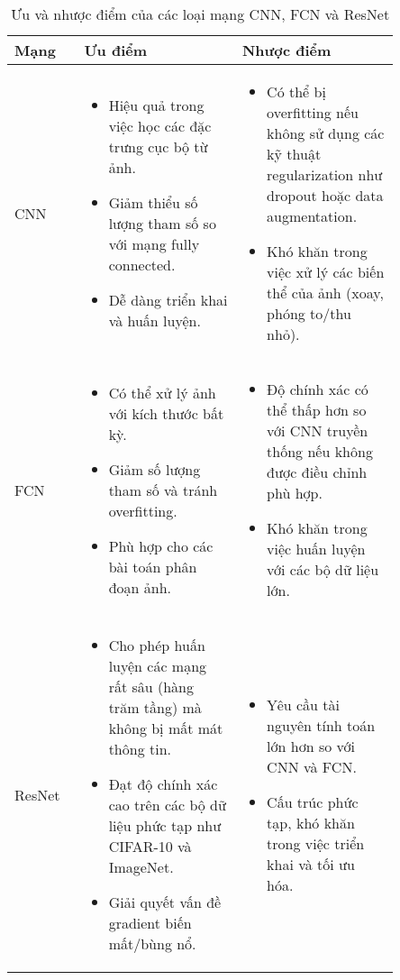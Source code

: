 \documentclass[../main.tex]{subfiles}
\begin{document}
\begin{table}[H]
\centering
\begin{tabular}{|>{\centering\arraybackslash}p{0.15\linewidth}|>{\centering\arraybackslash}p{0.35\linewidth}|>{\centering\arraybackslash}p{0.35\linewidth}|}
\hline
\textbf{Mạng} & \textbf{Ưu điểm} & \textbf{Nhược điểm} \\ \hline
CNN & 
\begin{itemize}
    \item Hiệu quả trong việc học các đặc trưng cục bộ từ ảnh.
    \item Giảm thiểu số lượng tham số so với mạng fully connected.
    \item Dễ dàng triển khai và huấn luyện.
\end{itemize} & 
\begin{itemize}
    \item Có thể bị overfitting nếu không sử dụng các kỹ thuật regularization như dropout hoặc data augmentation.
    \item Khó khăn trong việc xử lý các biến thể của ảnh (xoay, phóng to/thu nhỏ).
\end{itemize} \\ \hline
FCN & 
\begin{itemize}
    \item Có thể xử lý ảnh với kích thước bất kỳ.
    \item Giảm số lượng tham số và tránh overfitting.
    \item Phù hợp cho các bài toán phân đoạn ảnh.
\end{itemize} & 
\begin{itemize}
    \item Độ chính xác có thể thấp hơn so với CNN truyền thống nếu không được điều chỉnh phù hợp.
    \item Khó khăn trong việc huấn luyện với các bộ dữ liệu lớn.
\end{itemize} \\ \hline
ResNet & 
\begin{itemize}
    \item Cho phép huấn luyện các mạng rất sâu (hàng trăm tầng) mà không bị mất mát thông tin.
    \item Đạt độ chính xác cao trên các bộ dữ liệu phức tạp như CIFAR-10 và ImageNet.
    \item Giải quyết vấn đề gradient biến mất/bùng nổ.
\end{itemize} & 
\begin{itemize}
    \item Yêu cầu tài nguyên tính toán lớn hơn so với CNN và FCN.
    \item Cấu trúc phức tạp, khó khăn trong việc triển khai và tối ưu hóa.
\end{itemize} \\ \hline
\end{tabular}
\caption{Ưu và nhược điểm của các loại mạng CNN, FCN và ResNet}
\end{table}
\end{document}
